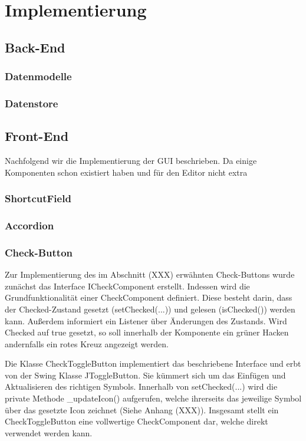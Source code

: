 \section{Implementierung}

\subsection{Back-End}

\subsubsection{Datenmodelle}

\subsubsection{Datenstore}

\subsection{Front-End}

Nachfolgend wir die Implementierung der GUI beschrieben. Da einige Komponenten schon existiert haben und für den Editor nicht extra

\subsubsection{ShortcutField}

\subsubsection{Accordion}

\newpage

\subsubsection{Check-Button}

Zur Implementierung des im Abschnitt (XXX) erwähnten Check-Buttons wurde zunächst das Interface ICheckComponent erstellt. Indessen wird die Grundfunktionalität einer CheckComponent definiert. Diese besteht darin, dass der Checked-Zustand gesetzt (setChecked(...)) und gelesen (isChecked()) werden kann. Außerdem informiert ein Listener über Änderungen des Zustands. Wird Checked auf true gesetzt, so soll innerhalb der Komponente ein grüner Hacken andernfalls ein rotes Kreuz angezeigt werden. 

Die Klasse CheckToggleButton implementiert das beschriebene Interface und erbt von der Swing Klasse JToggleButton. Sie kümmert sich um das Einfügen und Aktualisieren des richtigen Symbols. Innerhalb von setChecked(...) wird die private Methode \_updateIcon() aufgerufen, welche ihrerseits das jeweilige Symbol über das gesetzte Icon zeichnet (Siehe Anhang (XXX)). Insgesamt stellt ein CheckToggleButton eine vollwertige CheckComponent dar, welche direkt verwendet werden kann.

